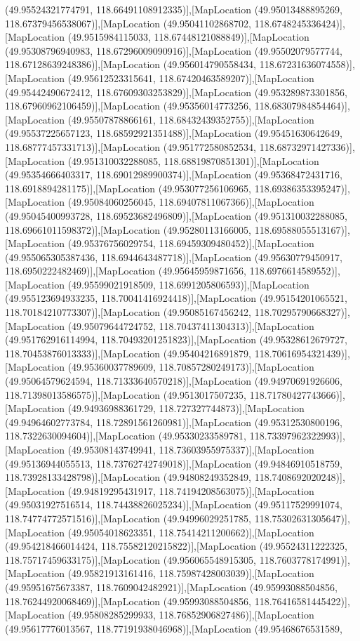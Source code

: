 (49.95524321774791, 118.66491108912335)],[MapLocation (49.95013488895269, 118.67379456538067)],[MapLocation (49.95041102868702, 118.6748245336424)],[MapLocation (49.9515984115033, 118.67448121088849)],[MapLocation (49.95308796940983, 118.67296009090916)],[MapLocation (49.95502079577744, 118.67128639248386)],[MapLocation (49.956014790558434, 118.67231636074558)],[MapLocation (49.95612523315641, 118.67420463589207)],[MapLocation (49.95442490672412, 118.67609303253829)],[MapLocation (49.953289873301856, 118.67960962106459)],[MapLocation (49.95356014773256, 118.68307984854464)],[MapLocation (49.95507878866161, 118.68432439352755)],[MapLocation (49.95537225657123, 118.68592921351488)],[MapLocation (49.95451630642649, 118.68777457331713)],[MapLocation (49.951772580852534, 118.68732971427336)],[MapLocation (49.951310032288085, 118.68819870851301)],[MapLocation (49.95354666403317, 118.69012989900374)],[MapLocation (49.95368472431716, 118.6918894281175)],[MapLocation (49.953077256106965, 118.69386353395247)],[MapLocation (49.95084060256045, 118.69407811067366)],[MapLocation (49.95045400993728, 118.69523682496809)],[MapLocation (49.951310032288085, 118.69661011598372)],[MapLocation (49.95280113166005, 118.69588055513167)],[MapLocation (49.95376756029754, 118.69459309480452)],[MapLocation (49.955065305387436, 118.6944643487718)],[MapLocation (49.95630779450917, 118.6950222482469)],[MapLocation (49.95645959871656, 118.6976614589552)],[MapLocation (49.95599021918509, 118.6991205806593)],[MapLocation (49.955123694933235, 118.70041416924418)],[MapLocation (49.95154201065521, 118.70184210773307)],[MapLocation (49.95085167456242, 118.70295790668327)],[MapLocation (49.95079644724752, 118.70437411304313)],[MapLocation (49.951762916114994, 118.70493201251823)],[MapLocation (49.95328612679727, 118.70453876013333)],[MapLocation (49.95404216891879, 118.70616954321439)],[MapLocation (49.95360037789609, 118.70857280249173)],[MapLocation (49.95064579624594, 118.71333640570218)],[MapLocation (49.94970691926606, 118.71398013586575)],[MapLocation (49.9513017507235, 118.71780427743666)],[MapLocation (49.94936988361729, 118.727327744873)],[MapLocation (49.94964602773784, 118.72891561260981)],[MapLocation (49.95312530800196, 118.7322630094604)],[MapLocation (49.95330233589781, 118.73397962322993)],[MapLocation (49.95308143749941, 118.73603955975337)],[MapLocation (49.95136944055513, 118.73762742749018)],[MapLocation (49.94846910518759, 118.73928133428798)],[MapLocation (49.94808249352849, 118.7408692020248)],[MapLocation (49.94819295431917, 118.74194208563075)],[MapLocation (49.95031927516514, 118.74438826025234)],[MapLocation (49.95117529991074, 118.74774772571516)],[MapLocation (49.94996029251785, 118.75302631305647)],[MapLocation (49.95054018623351, 118.75414211200662)],[MapLocation (49.954218466014424, 118.75582120215822)],[MapLocation (49.95524311222325, 118.75717459633175)],[MapLocation (49.956065548915305, 118.7603778174991)],[MapLocation (49.95821913161416, 118.75987428003039)],[MapLocation (49.95951675673387, 118.7609042482921)],[MapLocation (49.95993088504856, 118.76244920068469)],[MapLocation (49.95993088504856, 118.76416581445422)],[MapLocation (49.95808285299933, 118.76852906827486)],[MapLocation (49.95617776013567, 118.77191938046968)],[MapLocation (49.95468676531589, 